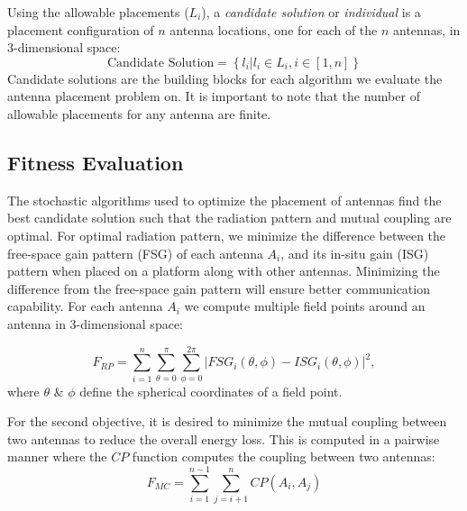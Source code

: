 \documentclass[conference]{IEEEtran}
\begin{document}
%
Using the allowable placements ($L_i$), a \textit{candidate solution} or \textit{individual} is a placement configuration of $n$ antenna locations, one for each of the $n$ antennas, in 3-dimensional space:
\[
    \text{Candidate Solution}  = \left\{l_i | l_i \in L_i, i \in [1,n]\right\}
\]
Candidate solutions are the building blocks for each algorithm we evaluate the antenna placement problem on. It is important to note that the number of allowable placements for any antenna are finite. 

\subsection{Fitness Evaluation}
The stochastic algorithms used to optimize the placement of antennas find the best candidate solution such that the radiation pattern and mutual coupling are optimal. For optimal radiation pattern, we minimize the difference between the free-space gain pattern (FSG) of each antenna $A_i$, and its in-situ gain (ISG) pattern when placed on a platform along with other antennas. Minimizing the difference from the free-space gain pattern will ensure better communication capability. For each antenna $A_i$ we compute multiple field points around an antenna in 3-dimensional space:

\begin{equation} \label{eq:rp}
    F_{RP} = \sum_{i=1}^n\sum_{\theta=0}^\pi\sum_{\phi=0}^{2\pi}
           \left| FSG_i(\theta,\phi) - ISG_i(\theta,\phi) \right| ^2,
\end{equation}
where $\theta$ \& $\phi$ define the spherical coordinates of a field point.

For the second objective, it is desired to minimize the mutual coupling between two antennas to reduce the overall energy loss. This is computed in a pairwise manner where the $CP$ function computes the coupling between two antennas:
\begin{equation}
  F_{MC} = \sum_{i=1}^{n-1}\sum_{j=i+1}^{n} CP(A_i, A_j)
\end{equation}
\end{document}
